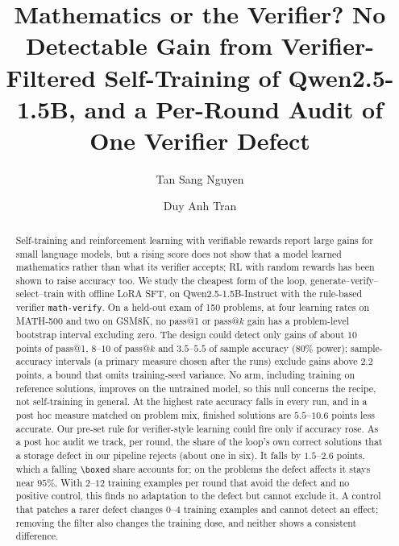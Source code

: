\documentclass[runningheads]{llncs}
\begin{document}
\title{Mathematics or the Verifier? No Detectable Gain from
Verifier-Filtered Self-Training of Qwen2.5-1.5B, and a Per-Round Audit of
One Verifier Defect}


\author{Tan Sang Nguyen \and Duy Anh Tran}

\maketitle

\begin{abstract}
Self-training and reinforcement learning with verifiable rewards report large
gains for small language models, but a rising score does not show that a
model learned mathematics rather than what its verifier accepts; RL with
random rewards has been shown to raise accuracy too. We study the cheapest
form of the loop, generate--verify--select--train with offline LoRA SFT, on
Qwen2.5-1.5B-Instruct with the rule-based verifier \texttt{math-verify}. On a
held-out exam of 150 problems, at four learning rates on MATH-500 and two on
GSM8K, no pass@1 or pass@$k$ gain has a problem-level bootstrap interval
excluding zero. The design could detect only gains of about $10$ points of
pass@1, $8$--$10$ of pass@$k$ and $3.5$--$5.5$ of sample accuracy ($80\%$
power); sample-accuracy intervals (a primary measure chosen after the runs)
exclude gains above $2.2$ points, a bound that omits training-seed variance.
No arm, including training on reference solutions, improves on the untrained
model, so this null concerns the recipe, not self-training in general. At the
highest rate accuracy falls in every run, and in a post hoc measure matched on
problem mix, finished solutions are $5.5$--$10.6$ points less accurate. Our
pre-set rule for verifier-style learning could fire only if accuracy rose. As
a post hoc audit we track, per round, the share of the loop's own correct
solutions that a storage defect in our pipeline rejects (about one in six).
It falls by $1.5$--$2.6$ points, which a falling \verb|\boxed| share accounts
for; on the problems the defect affects it stays near $95\%$. With $2$--$12$
training examples per round that avoid the defect and no positive control,
this finds no adaptation to the defect but cannot exclude it. A control that
patches a rarer defect changes $0$--$4$ training examples and cannot detect an
effect; removing the filter also changes the training dose, and neither shows
a consistent difference.

\end{abstract}
\end{document}
